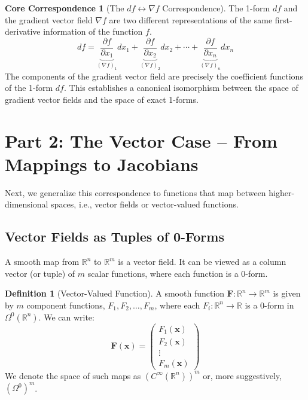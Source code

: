 \documentclass[12pt, letterpaper]{article}
\theoremstyle{definition}
\newtheorem{defn}{Definition}[section]
\newtheorem{idea}{Core Correspondence}[section]
\begin{document}
	\begin{idea}[The $df \longleftrightarrow \nabla f$ Correspondence]
		The 1-form $df$ and the gradient vector field $\nabla f$ are two different representations of the same first-derivative information of the function $f$.
		\begin{equation*}
			df = \underbrace{\frac{\partial f}{\partial x_1}}_{(\nabla f)_1} dx_1 + \underbrace{\frac{\partial f}{\partial x_2}}_{(\nabla f)_2} dx_2 + \cdots + \underbrace{\frac{\partial f}{\partial x_n}}_{(\nabla f)_n} dx_n
		\end{equation*}
		The components of the gradient vector field are precisely the coefficient functions of the 1-form $df$. This establishes a canonical isomorphism between the space of gradient vector fields and the space of exact 1-forms.
	\end{idea}
	
	\section{Part 2: The Vector Case -- From Mappings to Jacobians}
	
	Next, we generalize this correspondence to functions that map between higher-dimensional spaces, i.e., vector fields or vector-valued functions.
	
	\subsection{Vector Fields as Tuples of 0-Forms}
	A smooth map from $\mathbb{R}^n$ to $\mathbb{R}^m$ is a vector field. It can be viewed as a column vector (or tuple) of $m$ scalar functions, where each function is a 0-form.
	
	\begin{defn}[Vector-Valued Function]
		A smooth function $\mathbf{F}: \mathbb{R}^n \to \mathbb{R}^m$ is given by $m$ component functions, $F_1, F_2, \dots, F_m$, where each $F_i: \mathbb{R}^n \to \mathbb{R}$ is a 0-form in $\Omega^0(\mathbb{R}^n)$. We can write:
		\begin{equation*}
			\mathbf{F}(\mathbf{x}) = \begin{pmatrix} F_1(\mathbf{x}) \\ F_2(\mathbf{x}) \\ \vdots \\ F_m(\mathbf{x}) \end{pmatrix}
		\end{equation*}
		We denote the space of such maps as $(C^\infty(\mathbb{R}^n))^m$ or, more suggestively, $(\Omega^0)^m$.
	\end{defn}
	
\end{document}
